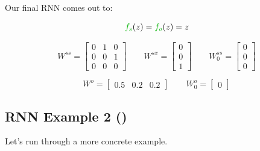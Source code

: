         \begin{remark}
            Our final RNN comes out to:

            \begin{equation*}
                \grn{f_s}(z)=\grn{f_o}(z)=z
            \end{equation*}

            \begin{equation*}
                W^{ss} = \begin{bmatrix}
                    0 & 1 & 0 \\
                    0 & 0 & 1 \\
                    0 & 0 & 0
                \end{bmatrix} \qquad
                W^{sx} = \begin{bmatrix}
                    0 \\ 0 \\ 1
                \end{bmatrix} \qquad
                W^{ss}_0 = \begin{bmatrix}
                    0 \\ 0 \\ 0
                \end{bmatrix}
            \end{equation*}

            \begin{equation*}
                W^{o} = \begin{bmatrix}
                    0.5 & 0.2 & 0.2
                \end{bmatrix} \qquad
                W^{o}_0 =\begin{bmatrix}
                    0
                \end{bmatrix}
            \end{equation*}
        \end{remark}

        

        

        

        

    \pagebreak

    \subsection{RNN Example 2 ()}

        Let's run through a more concrete example.

